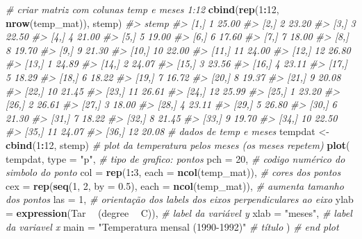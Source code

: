 \documentclass[]{book}
\newenvironment{Shaded}{\begin{snugshade}}{\end{snugshade}}
\newcommand{\KeywordTok}[1]{\textcolor[rgb]{0.13,0.29,0.53}{\textbf{#1}}}
\newcommand{\DataTypeTok}[1]{\textcolor[rgb]{0.13,0.29,0.53}{#1}}
\newcommand{\DecValTok}[1]{\textcolor[rgb]{0.00,0.00,0.81}{#1}}
\newcommand{\FloatTok}[1]{\textcolor[rgb]{0.00,0.00,0.81}{#1}}
\newcommand{\StringTok}[1]{\textcolor[rgb]{0.31,0.60,0.02}{#1}}
\newcommand{\CommentTok}[1]{\textcolor[rgb]{0.56,0.35,0.01}{\textit{#1}}}
\newcommand{\OperatorTok}[1]{\textcolor[rgb]{0.81,0.36,0.00}{\textbf{#1}}}
\newcommand{\NormalTok}[1]{#1}
\begin{document}
\begin{Shaded}
\begin{Highlighting}[]
\CommentTok{# criar matriz com colunas temp e meses 1:12}
\KeywordTok{cbind}\NormalTok{(}\KeywordTok{rep}\NormalTok{(}\DecValTok{1}\OperatorTok{:}\DecValTok{12}\NormalTok{, }\KeywordTok{nrow}\NormalTok{(temp_mat)), stemp)}
\CommentTok{#>          stemp}
\CommentTok{#>  [1,]  1 25.00}
\CommentTok{#>  [2,]  2 23.20}
\CommentTok{#>  [3,]  3 22.50}
\CommentTok{#>  [4,]  4 21.00}
\CommentTok{#>  [5,]  5 19.00}
\CommentTok{#>  [6,]  6 17.60}
\CommentTok{#>  [7,]  7 18.00}
\CommentTok{#>  [8,]  8 19.70}
\CommentTok{#>  [9,]  9 21.30}
\CommentTok{#> [10,] 10 22.00}
\CommentTok{#> [11,] 11 24.00}
\CommentTok{#> [12,] 12 26.80}
\CommentTok{#> [13,]  1 24.89}
\CommentTok{#> [14,]  2 24.07}
\CommentTok{#> [15,]  3 23.56}
\CommentTok{#> [16,]  4 23.11}
\CommentTok{#> [17,]  5 18.29}
\CommentTok{#> [18,]  6 18.22}
\CommentTok{#> [19,]  7 16.72}
\CommentTok{#> [20,]  8 19.37}
\CommentTok{#> [21,]  9 20.08}
\CommentTok{#> [22,] 10 21.45}
\CommentTok{#> [23,] 11 26.61}
\CommentTok{#> [24,] 12 25.99}
\CommentTok{#> [25,]  1 23.20}
\CommentTok{#> [26,]  2 26.61}
\CommentTok{#> [27,]  3 18.00}
\CommentTok{#> [28,]  4 23.11}
\CommentTok{#> [29,]  5 26.80}
\CommentTok{#> [30,]  6 21.30}
\CommentTok{#> [31,]  7 18.22}
\CommentTok{#> [32,]  8 21.45}
\CommentTok{#> [33,]  9 19.70}
\CommentTok{#> [34,] 10 22.50}
\CommentTok{#> [35,] 11 24.07}
\CommentTok{#> [36,] 12 20.08}
\CommentTok{# dados de temp e meses}
\NormalTok{tempdat <-}\StringTok{ }\KeywordTok{cbind}\NormalTok{(}\DecValTok{1}\OperatorTok{:}\DecValTok{12}\NormalTok{, stemp)}
\CommentTok{# plot da temperatura pelos meses (os meses repetem)}
\KeywordTok{plot}\NormalTok{(}
\NormalTok{  tempdat,}
  \DataTypeTok{type =} \StringTok{"p"}\NormalTok{, }\CommentTok{# tipo de grafico: pontos}
  \DataTypeTok{pch =} \DecValTok{20}\NormalTok{, }\CommentTok{# codigo numérico do simbolo do ponto}
  \DataTypeTok{col =} \KeywordTok{rep}\NormalTok{(}\DecValTok{1}\OperatorTok{:}\DecValTok{3}\NormalTok{, }\DataTypeTok{each =} \KeywordTok{ncol}\NormalTok{(temp_mat)), }\CommentTok{# cores dos pontos}
  \DataTypeTok{cex =} \KeywordTok{rep}\NormalTok{(}\KeywordTok{seq}\NormalTok{(}\DecValTok{1}\NormalTok{, }\DecValTok{2}\NormalTok{, }\DataTypeTok{by =} \FloatTok{0.5}\NormalTok{), }\DataTypeTok{each =} \KeywordTok{ncol}\NormalTok{(temp_mat)), }\CommentTok{# aumenta tamanho dos pontos}
  \DataTypeTok{las =} \DecValTok{1}\NormalTok{, }\CommentTok{# orientação dos labels dos eixos perpendiculares ao eixo}
  \DataTypeTok{ylab =} \KeywordTok{expression}\NormalTok{(Tar }\OperatorTok{~}\StringTok{ }\NormalTok{(degree }\OperatorTok{~}\StringTok{ }\NormalTok{C)), }\CommentTok{# label da variável y}
  \DataTypeTok{xlab =} \StringTok{"meses"}\NormalTok{, }\CommentTok{# label da variavel x}
  \DataTypeTok{main =} \StringTok{"Temperatura mensal (1990-1992)"} \CommentTok{# título}
\NormalTok{) }\CommentTok{# end plot}
\end{Highlighting}
\end{Shaded}
\end{document}
